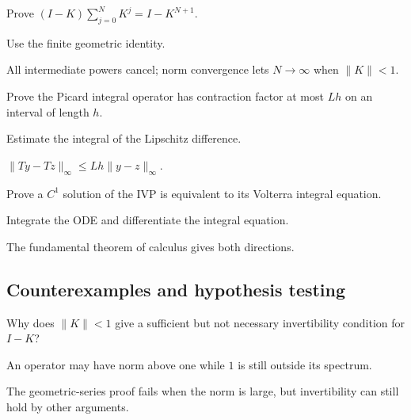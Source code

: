 \begin{exercise}\label{exr:ii18-expand-07}
Prove \((I-K)\sum_{j=0}^N K^j=I-K^{N+1}\).
\end{exercise}
\begin{hint}
Use the finite geometric identity.
\end{hint}
\begin{solution}
All intermediate powers cancel; norm convergence lets \(N\to\infty\) when \(\|K\|<1\).
\end{solution}

\begin{exercise}\label{exr:ii18-expand-08}
Prove the Picard integral operator has contraction factor at most \(Lh\) on an interval of length \(h\).
\end{exercise}
\begin{hint}
Estimate the integral of the Lipschitz difference.
\end{hint}
\begin{solution}
\(\|Ty-Tz\|_\infty\le Lh\|y-z\|_\infty\).
\end{solution}

\begin{exercise}\label{exr:ii18-expand-09}
Prove a \(C^1\) solution of the IVP is equivalent to its Volterra integral equation.
\end{exercise}
\begin{hint}
Integrate the ODE and differentiate the integral equation.
\end{hint}
\begin{solution}
The fundamental theorem of calculus gives both directions.
\end{solution}

\subsection*{Counterexamples and hypothesis testing}

\begin{exercise}\label{exr:ii18-expand-10}
Why does \(\|K\|<1\) give a sufficient but not necessary invertibility condition for \(I-K\)?
\end{exercise}
\begin{hint}
An operator may have norm above one while \(1\) is still outside its spectrum.
\end{hint}
\begin{solution}
The geometric-series proof fails when the norm is large, but invertibility can still hold by other arguments.
\end{solution}

